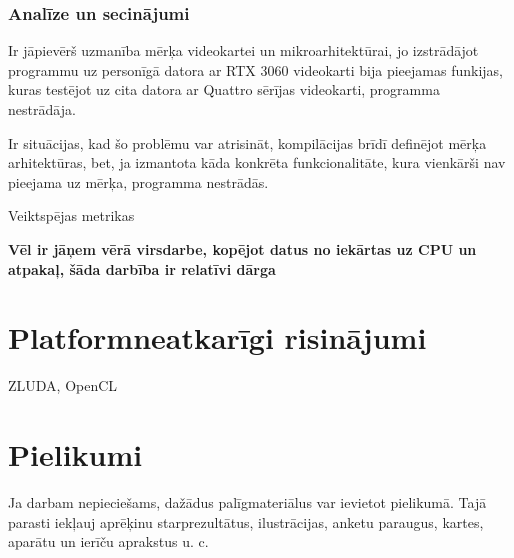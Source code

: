 \documentclass[12pt]{report}%
\theoremstyle{definition}
\begin{document}
\subsection{Analīze un secinājumi}

Ir jāpievērš uzmanība mērķa videokartei un mikroarhitektūrai, jo izstrādājot programmu uz personīgā datora 
ar RTX 3060 videokarti bija pieejamas funkijas, kuras testējot uz cita datora ar Quattro sērījas videokarti,
programma nestrādāja.

Ir situācijas, kad šo problēmu var atrisināt, kompilācijas brīdī definējot mērķa arhitektūras, bet,
ja izmantota kāda konkrēta funkcionalitāte, kura vienkārši nav pieejama uz mērķa, programma nestrādās.


Veiktspējas metrikas

\textbf{Vēl ir jāņem vērā virsdarbe, kopējot datus no iekārtas uz CPU un atpakaļ, šāda darbība ir relatīvi dārga}

\chapter{Platformneatkarīgi risinājumi}
ZLUDA, OpenCL


\cleardoublepage
{}
{}
\printbibliography

\newpage
\chapter*{Pielikumi}


Ja darbam nepieciešams, dažādus palīgmateriālus var ievietot pielikumā. Tajā
parasti iekļauj aprēķinu starprezultātus, ilustrācijas, anketu paraugus, kartes, aparātu un ierīču aprakstus u. c.
\end{document}
